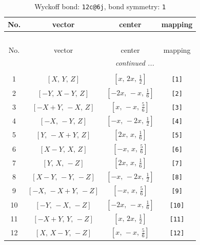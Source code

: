\documentclass[fleqn,8pt]{jsarticle}
\begin{document}
\begin{longtable}{cccc}
\caption{Wyckoff bond: {\tt 12c@6j}, bond symmetry: {\tt 1}}
 \\
 \hline \hline
No. & vector & center & mapping \\ \hline \endfirsthead

\multicolumn{3}{l}{\tablename\ \thetable{}} \\
 \hline \hline
No. & vector & center & mapping \\ \hline \endhead

 \hline \hline
\multicolumn{3}{r}{\footnotesize\it continued ...} \\ \endfoot

 \hline \hline
\multicolumn{3}{r}{} \\ \endlastfoot

1 & $\left[ X,\, Y,\, Z \right]$ & $\left[ x,\, 2 x,\, \frac{1}{2} \right]$ & {\tt [1]} \\ \hline
2 & $\left[ - Y,\, X - Y,\, Z \right]$ & $\left[ - 2 x,\, - x,\, \frac{1}{6} \right]$ & {\tt [2]} \\ \hline
3 & $\left[ - X + Y,\, - X,\, Z \right]$ & $\left[ x,\, - x,\, \frac{5}{6} \right]$ & {\tt [3]} \\ \hline
4 & $\left[ - X,\, - Y,\, Z \right]$ & $\left[ - x,\, - 2 x,\, \frac{1}{2} \right]$ & {\tt [4]} \\ \hline
5 & $\left[ Y,\, - X + Y,\, Z \right]$ & $\left[ 2 x,\, x,\, \frac{1}{6} \right]$ & {\tt [5]} \\ \hline
6 & $\left[ X - Y,\, X,\, Z \right]$ & $\left[ - x,\, x,\, \frac{5}{6} \right]$ & {\tt [6]} \\ \hline
7 & $\left[ Y,\, X,\, - Z \right]$ & $\left[ 2 x,\, x,\, \frac{1}{6} \right]$ & {\tt [7]} \\ \hline
8 & $\left[ X - Y,\, - Y,\, - Z \right]$ & $\left[ - x,\, - 2 x,\, \frac{1}{2} \right]$ & {\tt [8]} \\ \hline
9 & $\left[ - X,\, - X + Y,\, - Z \right]$ & $\left[ - x,\, x,\, \frac{5}{6} \right]$ & {\tt [9]} \\ \hline
10 & $\left[ - Y,\, - X,\, - Z \right]$ & $\left[ - 2 x,\, - x,\, \frac{1}{6} \right]$ & {\tt [10]} \\ \hline
11 & $\left[ - X + Y,\, Y,\, - Z \right]$ & $\left[ x,\, 2 x,\, \frac{1}{2} \right]$ & {\tt [11]} \\ \hline
12 & $\left[ X,\, X - Y,\, - Z \right]$ & $\left[ x,\, - x,\, \frac{5}{6} \right]$ & {\tt [12]} \\
\end{longtable}
\end{document}
